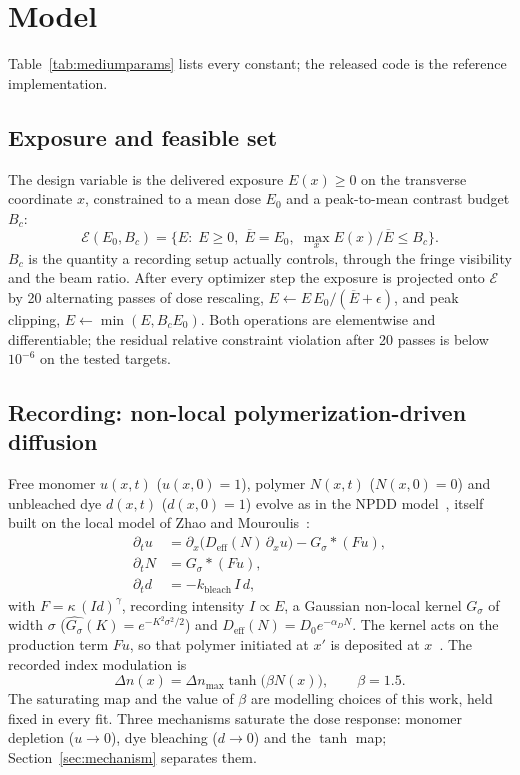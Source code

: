 \documentclass{optica-article}
\begin{document}
\section{Model}
\label{sec:model}
Table~\ref{tab:mediumparams} lists every constant; the released code is the
reference implementation.

\subsection{Exposure and feasible set}
\label{sec:model-exposure}
The design variable is the delivered exposure $E(x)\ge 0$ on the transverse
coordinate $x$, constrained to a mean dose $E_0$ and a peak-to-mean contrast
budget $B_c$:
\begin{equation}
\label{eq:feasible-set}
\mathcal{E}(E_0,B_c)=\Big\{E:\;E\ge0,\;\overline{E}=E_0,\;
\max_x E(x)/\overline{E}\le B_c\Big\}.
\end{equation}
$B_c$ is the quantity a recording setup actually controls, through the fringe
visibility and the beam ratio. After every optimizer step the exposure is
projected onto $\mathcal{E}$ by 20 alternating passes of dose rescaling,
$E\leftarrow E\,E_0/(\overline{E}+\epsilon)$, and peak clipping,
$E\leftarrow\min(E,B_cE_0)$. Both operations are elementwise and
differentiable; the residual relative constraint violation after 20 passes is
below $10^{-6}$ on the tested targets.

\subsection{Recording: non-local polymerization-driven diffusion}
\label{sec:model-npdd}
Free monomer $u(x,t)$ ($u(x,0)=1$), polymer $N(x,t)$ ($N(x,0)=0$) and
unbleached dye $d(x,t)$ ($d(x,0)=1$) evolve as in the NPDD
model~\cite{sheridan2000nonlocal}, itself built on the local model of Zhao and
Mouroulis~\cite{zhao1994diffusion}:
\begin{align}
\partial_t u &= \partial_x\!\big(D_{\text{eff}}(N)\,\partial_x u\big) - G_\sigma*(F u), \label{eq:npdd-u}\\
\partial_t N &= G_\sigma*(F u), \label{eq:npdd-N}\\
\partial_t d &= -k_{\text{bleach}}\,I\,d, \label{eq:npdd-d}
\end{align}
with $F=\kappa\,(I d)^\gamma$, recording intensity $I\propto E$, a Gaussian
non-local kernel $G_\sigma$ of width $\sigma$
($\widehat{G_\sigma}(K)=e^{-K^2\sigma^2/2}$) and
$D_{\text{eff}}(N)=D_0e^{-\alpha_D N}$. The kernel acts on the production term
$Fu$, so that polymer initiated at $x'$ is deposited at
$x$~\cite{sheridan2000nonlocal}. The recorded index modulation is
\begin{equation}
\label{eq:npdd-dn}
\Delta n(x)=\Delta n_{\max}\tanh\!\big(\beta N(x)\big),\qquad \beta=1.5 .
\end{equation}
The saturating map and the value of $\beta$ are modelling choices of this
work, held fixed in every fit. Three mechanisms saturate the dose response:
monomer depletion ($u\to0$), dye bleaching ($d\to0$) and the $\tanh$ map;
Section~\ref{sec:mechanism} separates them.
\end{document}
